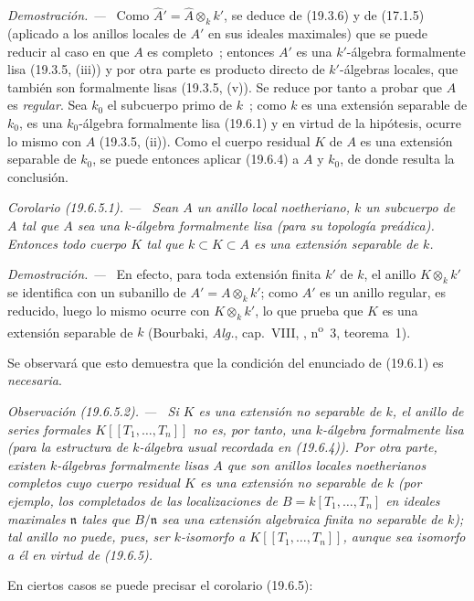 \documentclass[10pt,oneside]{book}
\makeatletter
\newcommand{\setmanualcurrentlabel}[1]{\def\@currentlabel{#1}}
\newcommand{\oldpage}[2][]{%
  \setcounter{footnote}{0}%
  \marginpar{\scriptsize\textbf{#1}~|~#2}\ignorespaces}
\newenvironment{corollary}[1][]{%
  \setmanualcurrentlabel{#1}\par\medskip\noindent\itshape Corolario (#1). ---\ }{\par}
\newenvironment{remark}[1][]{%
  \setmanualcurrentlabel{#1}\par\medskip\noindent\itshape Observación (#1). ---\ }{\par}
\newenvironment{proof}{%
  \par\medskip\noindent\textit{Demostración. ---\ }}{\par}
\makeatother
\begin{document}
\begin{proof}
Como $\widehat A'=\widehat A\otimes_k k'$, se deduce de (19.3.6) y de
(17.1.5) (aplicado a los anillos locales de $A'$ en sus ideales maximales) que se
puede reducir al caso en que $A$ es completo~; entonces $A'$ es una $k'$-álgebra
formalmente lisa (19.3.5, (iii)) y por otra parte es producto directo de
$k'$-álgebras locales, que también son formalmente lisas (19.3.5, (v)). Se
reduce por tanto a probar que $A$ es \emph{regular}. Sea $k_0$ el subcuerpo
primo de $k$~; como $k$ es una extensión separable de $k_0$, es una
$k_0$-álgebra formalmente lisa (19.6.1) y en virtud de la hipótesis, ocurre lo
mismo con $A$ (19.3.5, (ii)). Como el cuerpo residual $K$ de $A$ es una
extensión separable de $k_0$, se puede entonces aplicar (19.6.4) a $A$ y $k_0$,
de donde resulta la conclusión.
\end{proof}

\oldpage[0\textsubscript{IV-1}]{103}
 
\begin{corollary}[19.6.5.1]
\label{0.19.6.5.1-es}
Sean $A$ un anillo local noetheriano, $k$ un subcuerpo de $A$ tal que $A$
sea una $k$-álgebra formalmente lisa (para su topología preádica). Entonces
todo cuerpo $K$ tal que $k\subset K\subset A$ es una extensión separable de
$k$.
\end{corollary}

\begin{proof}
En efecto, para toda extensión finita $k'$ de $k$, el anillo $K\otimes_k k'$
se identifica con un subanillo de $A'=A\otimes_k k'$; como $A'$ es un anillo
regular, es reducido, luego lo mismo ocurre con $K\otimes_k k'$, lo que prueba que $K$
es una extensión separable de $k$ (Bourbaki, \emph{Alg.}, cap.~VIII,
, n\textsuperscript{o}~3, teorema~1).
\end{proof}

Se observará que esto demuestra que la condición del enunciado de (19.6.1) es
\emph{necesaria}.

\begin{remark}[19.6.5.2]
\label{0.19.6.5.2-es}
Si $K$ es una extensión \emph{no separable} de $k$, el anillo de series
formales $K[[T_1,\ldots,T_n]]$ \emph{no es, por tanto}, una $k$-álgebra
formalmente lisa (para la estructura de $k$-álgebra usual recordada en
(19.6.4)). Por otra parte, existen $k$-álgebras formalmente lisas $A$ que
son anillos locales noetherianos completos cuyo cuerpo residual $K$ es una
extensión \emph{no separable} de $k$ (por ejemplo, los completados de las
localizaciones de $B=k[T_1,\ldots,T_n]$ en ideales maximales $\mathfrak n$ tales
que $B/\mathfrak n$ sea una extensión algebraica finita no separable de $k$);
tal anillo no puede, pues, ser \emph{$k$-isomorfo} a $K[[T_1,\ldots,T_n]]$, aunque
sea \emph{isomorfo} a él en virtud de (19.6.5).

En ciertos casos se puede precisar el corolario (19.6.5):
\end{remark}
\end{document}
